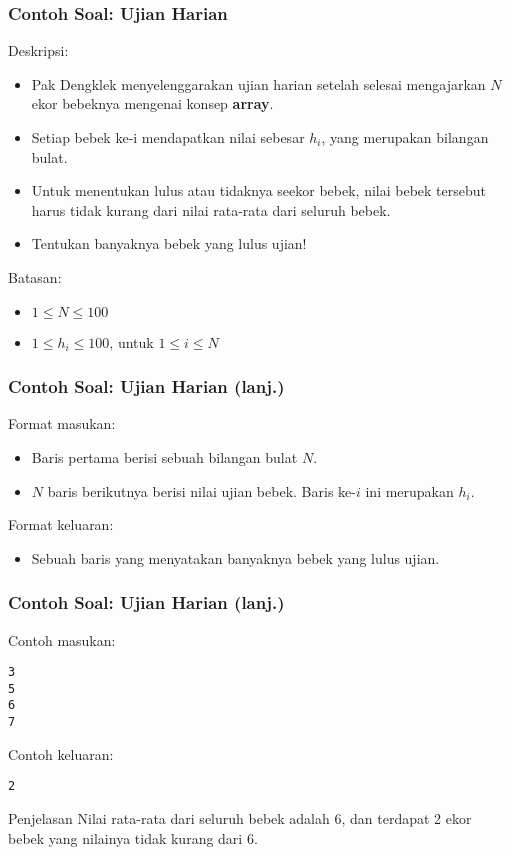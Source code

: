 \documentclass{beamer}
\begin{document}
\begin{frame}
\frametitle{Contoh Soal: Ujian Harian}
Deskripsi:
\begin{itemize}
    \item Pak Dengklek menyelenggarakan ujian harian setelah selesai mengajarkan $N$ ekor bebeknya mengenai konsep \textbf{array}.
    \item Setiap bebek ke-i mendapatkan nilai sebesar \textbf{$h_i$}, yang merupakan bilangan bulat.
    \item Untuk menentukan lulus atau tidaknya seekor bebek, nilai bebek tersebut harus tidak kurang dari nilai rata-rata dari seluruh bebek.
    \item Tentukan banyaknya bebek yang lulus ujian!
\end{itemize}
Batasan:
\begin{itemize}
    \item $1 \le N \le 100$
    \item $1 \le h_i \le 100$, untuk $1 \le i \le N$
\end{itemize}
\end{frame}

\begin{frame}
\frametitle{Contoh Soal: Ujian Harian (lanj.)}
Format masukan:
\begin{itemize}
    \item Baris pertama berisi sebuah bilangan bulat $N$.
    \item $N$ baris berikutnya berisi nilai ujian bebek. Baris ke-$i$ ini merupakan $h_i$.
\end{itemize}
Format keluaran:
\begin{itemize}
    \item Sebuah baris yang menyatakan banyaknya bebek yang lulus ujian.
\end{itemize}
\end{frame}

\begin{frame}[fragile]
\frametitle{Contoh Soal: Ujian Harian (lanj.)}
Contoh masukan:
\begin{lstlisting}
3
5
6
7
\end{lstlisting}
Contoh keluaran:
\begin{lstlisting}
2
\end{lstlisting}
\begin{block}{Penjelasan}
Nilai rata-rata dari seluruh bebek adalah 6, dan terdapat 2 ekor bebek yang nilainya tidak kurang dari 6.
\end{block}
\end{frame}
\end{document}
